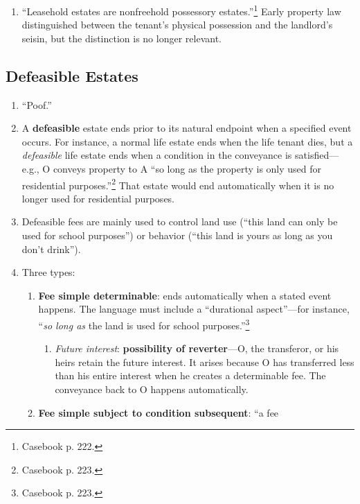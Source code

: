 \begin{enumerate}
    \item ``Leasehold estates are nonfreehold possessory 
    estates.''\footnote{Casebook p. 222.} Early property law distinguished 
    between the tenant's physical possession and the landlord's seisin, but 
    the distinction is no longer relevant.
\end{enumerate}

\subsection{Defeasible Estates}

\begin{enumerate}
    \item ``Poof.''
    \item A \textbf{defeasible} estate ends prior to its natural endpoint when 
    a specified event occurs. For instance, a normal life estate ends when the 
    life tenant dies, but a \emph{defeasible} life estate ends when a 
    condition in the conveyance is satisfied---e.g., O conveys property to A 
    ``so long as the property is only used for residential 
    purposes.''\footnote{Casebook p. 223.} That estate would end automatically 
    when it is no longer used for residential purposes.
    \item Defeasible fees are mainly used to control land use (``this land can 
    only be used for school purposes'') or behavior (``this land is yours as 
    long as you don't drink'').
    \item Three types:
    \begin{enumerate}
        \item \textbf{Fee simple determinable}: ends automatically when a 
        stated event happens. The language must include a ``durational 
        aspect''---for instance, ``\emph{so long as} the land is used for 
        school purposes.''\footnote{Casebook p. 223.}
        \begin{enumerate}
            \item \emph{Future interest}: \textbf{possibility of 
            reverter}---O, the transferor, or his heirs retain the future 
            interest. It arises because O has transferred less than his entire 
            interest when he creates a determinable fee. The conveyance back 
            to O happens automatically.
        \end{enumerate}
        \item \textbf{Fee simple subject to condition subsequent}: ``a fee 

\end{enumerate}
\end{enumerate}
